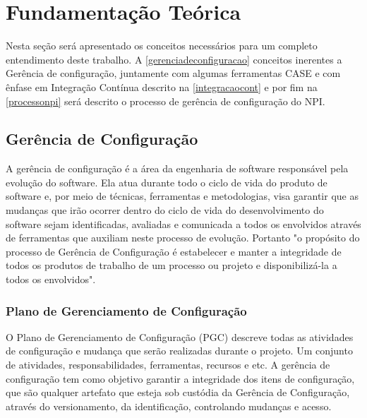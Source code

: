 \chapter{Fundamentação Teórica}\label{fundamentacao}
Nesta seção será apresentado os conceitos necessários para um completo entendimento deste trabalho. A \autoref{gerenciadeconfiguracao} conceitos inerentes a Gerência de configuração, juntamente com algumas ferramentas CASE e com ênfase em Integração Contínua descrito na \autoref{integracaocont} e por fim na \autoref{processonpi} será descrito o processo de gerência de configuração do NPI.

\section{Gerência de Configuração}\label{gerenciadeconfiguracao}
A gerência de configuração é a área da engenharia de software responsável pela evolução do software. Ela atua durante todo o ciclo de vida do produto de software e, por meio de técnicas, ferramentas e metodologias, visa garantir que as mudanças que irão ocorrer dentro do ciclo de vida do desenvolvimento do software sejam identificadas, avaliadas e comunicada a todos os envolvidos através de ferramentas que auxiliam neste processo de evolução.
Portanto "o propósito do processo de Gerência de Configuração é estabelecer e manter a integridade de todos os produtos de trabalho de um processo ou projeto e disponibilizá-la a todos os envolvidos"\space\cite{mpsbr}.
\subsection{Plano de Gerenciamento de Configuração}\label{pgc}
O Plano de Gerenciamento de Configuração (PGC) descreve todas as atividades de configuração e mudança que serão realizadas durante o projeto. Um conjunto de atividades, responsabilidades, ferramentas, recursos e etc. A gerência de configuração tem como objetivo garantir a integridade dos itens de configuração, que são qualquer artefato que esteja sob custódia da Gerência de Configuração, através do versionamento, da identificação, controlando mudanças e acesso. 

